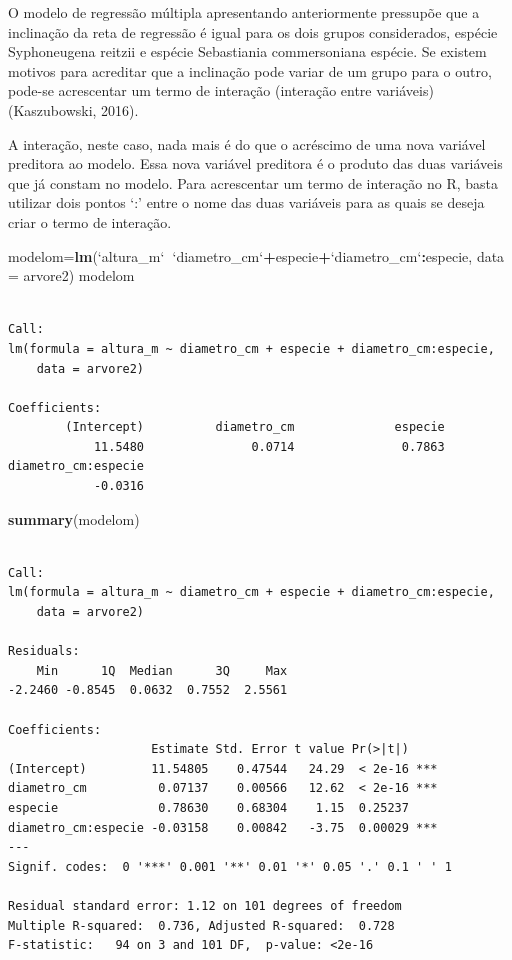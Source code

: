 \documentclass[12pt,brazil,oneside]{book}
\newenvironment{Shaded}{\begin{snugshade}}{\end{snugshade}}
\newcommand{\DataTypeTok}[1]{\textcolor[rgb]{0.13,0.29,0.53}{#1}}
\newcommand{\KeywordTok}[1]{\textcolor[rgb]{0.13,0.29,0.53}{\textbf{#1}}}
\newcommand{\NormalTok}[1]{#1}
\newcommand{\OperatorTok}[1]{\textcolor[rgb]{0.81,0.36,0.00}{\textbf{#1}}}
\newcommand{\StringTok}[1]{\textcolor[rgb]{0.31,0.60,0.02}{#1}}
\begin{document}
O modelo de regressão múltipla apresentando anteriormente pressupõe que
a inclinação da reta de regressão é igual para os dois grupos
considerados, espécie Syphoneugena reitzii e espécie Sebastiania
commersoniana espécie. Se existem motivos para acreditar que a
inclinação pode variar de um grupo para o outro, pode-se acrescentar um
termo de interação (interação entre variáveis) (Kaszubowski, 2016).

A interação, neste caso, nada mais é do que o acréscimo de uma nova
variável preditora ao modelo. Essa nova variável preditora é o produto
das duas variáveis que já constam no modelo. Para acrescentar um termo
de interação no R, basta utilizar dois pontos `:' entre o nome das duas
variáveis para as quais se deseja criar o termo de interação.

\begin{Shaded}
\begin{Highlighting}[]
\NormalTok{modelom=}\KeywordTok{lm}\NormalTok{(}\StringTok{`}\DataTypeTok{altura_m}\StringTok{`}\OperatorTok{~}\StringTok{`}\DataTypeTok{diametro_cm}\StringTok{`}\OperatorTok{+}\NormalTok{especie}\OperatorTok{+}\StringTok{`}\DataTypeTok{diametro_cm}\StringTok{`}\OperatorTok{:}\NormalTok{especie, }\DataTypeTok{data =}\NormalTok{ arvore2)}
\NormalTok{modelom}
\end{Highlighting}
\end{Shaded}

\begin{verbatim}

Call:
lm(formula = altura_m ~ diametro_cm + especie + diametro_cm:especie, 
    data = arvore2)

Coefficients:
        (Intercept)          diametro_cm              especie  
            11.5480               0.0714               0.7863  
diametro_cm:especie  
            -0.0316  
\end{verbatim}

\begin{Shaded}
\begin{Highlighting}[]
\KeywordTok{summary}\NormalTok{(modelom)}
\end{Highlighting}
\end{Shaded}

\begin{verbatim}

Call:
lm(formula = altura_m ~ diametro_cm + especie + diametro_cm:especie, 
    data = arvore2)

Residuals:
    Min      1Q  Median      3Q     Max 
-2.2460 -0.8545  0.0632  0.7552  2.5561 

Coefficients:
                    Estimate Std. Error t value Pr(>|t|)    
(Intercept)         11.54805    0.47544   24.29  < 2e-16 ***
diametro_cm          0.07137    0.00566   12.62  < 2e-16 ***
especie              0.78630    0.68304    1.15  0.25237    
diametro_cm:especie -0.03158    0.00842   -3.75  0.00029 ***
---
Signif. codes:  0 '***' 0.001 '**' 0.01 '*' 0.05 '.' 0.1 ' ' 1

Residual standard error: 1.12 on 101 degrees of freedom
Multiple R-squared:  0.736, Adjusted R-squared:  0.728 
F-statistic:   94 on 3 and 101 DF,  p-value: <2e-16
\end{verbatim}
\end{document}
